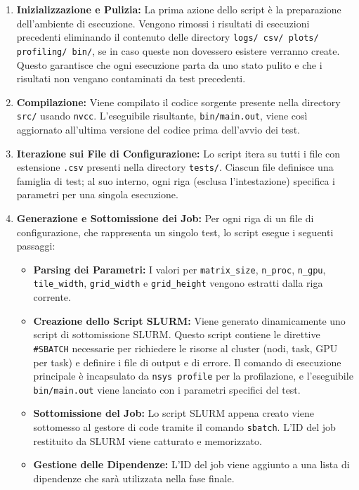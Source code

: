 \documentclass[a4paper]{article}
\begin{document}
\begin{enumerate}
    \item \textbf{Inizializzazione e Pulizia:} La prima azione dello script è la preparazione dell'ambiente di esecuzione. Vengono rimossi i risultati di esecuzioni precedenti eliminando il contenuto delle directory \texttt{logs/ csv/ plots/ profiling/ bin/}, se in caso queste non dovessero esistere verranno create. Questo garantisce che ogni esecuzione parta da uno stato pulito e che i risultati non vengano contaminati da test precedenti.

    \item \textbf{Compilazione:} Viene compilato il codice sorgente presente nella directory \texttt{src/} usando \texttt{nvcc}. L'eseguibile risultante, \texttt{bin/main.out}, viene così aggiornato all'ultima versione del codice prima dell'avvio dei test.

    \item \textbf{Iterazione sui File di Configurazione:} Lo script itera su tutti i file con estensione \texttt{.csv} presenti nella directory \texttt{tests/}. Ciascun file definisce una famiglia di test; al suo interno, ogni riga (esclusa l'intestazione) specifica i parametri per una singola esecuzione.

    \item \textbf{Generazione e Sottomissione dei Job:} Per ogni riga di un file di configurazione, che rappresenta un singolo test, lo script esegue i seguenti passaggi:
    \begin{itemize}
        \item \textbf{Parsing dei Parametri:} I valori per \texttt{matrix\_size}, \texttt{n\_proc}, \texttt{n\_gpu}, \texttt{tile\_width}, \texttt{grid\_width} e \texttt{grid\_height} vengono estratti dalla riga corrente.
        \item \textbf{Creazione dello Script SLURM:} Viene generato dinamicamente uno script di sottomissione SLURM. Questo script contiene le direttive \texttt{\#SBATCH} necessarie per richiedere le risorse al cluster (nodi, task, GPU per task) e definire i file di output e di errore. Il comando di esecuzione principale è incapsulato da \texttt{nsys profile} per la profilazione, e l'eseguibile \texttt{bin/main.out} viene lanciato con i parametri specifici del test.
        \item \textbf{Sottomissione del Job:} Lo script SLURM appena creato viene sottomesso al gestore di code tramite il comando \texttt{sbatch}. L'ID del job restituito da SLURM viene catturato e memorizzato.
        \item \textbf{Gestione delle Dipendenze:} L'ID del job viene aggiunto a una lista di dipendenze che sarà utilizzata nella fase finale.
    \end{itemize}


\end{enumerate}
\end{document}
